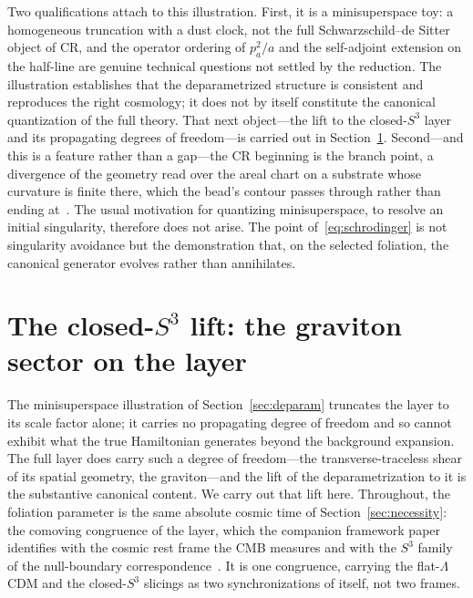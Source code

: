 \documentclass[11pt,a4paper]{article}
\theoremstyle{plain}
\theoremstyle{definition}
\theoremstyle{remark}
\begin{document}
Two qualifications attach to this illustration. First, it is a minisuperspace toy: a homogeneous truncation with a dust clock, not the full Schwarzschild--de Sitter object of CR, and the operator ordering of $p_a^2/a$ and the self-adjoint extension on the half-line are genuine technical questions not settled by the reduction. The illustration establishes that the deparametrized structure is consistent and reproduces the right cosmology; it does not by itself constitute the canonical quantization of the full theory. That next object---the lift to the closed-$S^3$ layer and its propagating degrees of freedom---is carried out in Section~\ref{sec:lock}. Second---and this is a feature rather than a gap---the CR beginning is the branch point, a divergence of the geometry read over the areal chart on a substrate whose curvature is finite there, which the bead's contour passes through rather than ending at~\cite{JanzenBHcausality, JanzenCRframework}. The usual motivation for quantizing minisuperspace, to resolve an initial singularity, therefore does not arise. The point of~\eqref{eq:schrodinger} is not singularity avoidance but the demonstration that, on the selected foliation, the canonical generator evolves rather than annihilates.

\section{The closed-$S^3$ lift: the graviton sector on the layer}\label{sec:lock}

The minisuperspace illustration of Section~\ref{sec:deparam} truncates the layer to its scale factor alone; it carries no propagating degree of freedom and so cannot exhibit what the true Hamiltonian generates beyond the background expansion. The full layer does carry such a degree of freedom---the transverse-traceless shear of its spatial geometry, the graviton---and the lift of the deparametrization to it is the substantive canonical content. We carry out that lift here. Throughout, the foliation parameter is the same absolute cosmic time of Section~\ref{sec:necessity}: the comoving congruence of the layer, which the companion framework paper identifies with the cosmic rest frame the CMB measures and with the $S^3$ family of the null-boundary correspondence~\cite{JanzenCRframework}. It is one congruence, carrying the flat-$\Lambda$CDM and the closed-$S^3$ slicings as two synchronizations of itself, not two frames.
\end{document}

